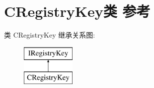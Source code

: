 \hypertarget{class_c_registry_key}{}\section{C\+Registry\+Key类 参考}
\label{class_c_registry_key}
类 C\+Registry\+Key 继承关系图\+:\begin{figure}[H]
\begin{center}
\leavevmode
\includegraphics[height=2.000000cm]{class_c_registry_key}
\end{center}
\end{figure}
